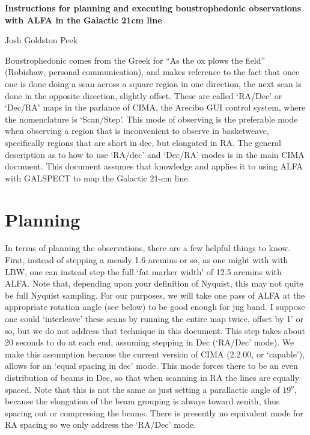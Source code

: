 \setlength{\textheight}{21.5cm}
\setlength{\textwidth}{7in}
\setlength{\topmargin}{-0.25in}
\setlength{\oddsidemargin}{-0.25in}
\setlength{\evensidemargin}{0mm}
\setlength{\parindent}{0em}
\setlength{\headsep}{10.0mm}

\def\baselinestretch{1.0}
\pagestyle{myheadings}
\def\kms{km~s$^{-1}$}


\parskip 5pt
\begin{center}
  {\Large \bf Instructions for planning and executing boustrophedonic observations with ALFA in the Galactic 21cm line}

\vspace{0.5cm} {\large Josh Goldston Peek}
\end{center}

Boustrophedonic comes from the Greek for ``As the ox plows the field'' (Robishaw, personal communication), and makes reference to the fact that once one is done doing a scan across a square region in one direction, the next scan is done in the opposite direction, slightly offset. These are called `RA/Dec' or `Dec/RA' maps in the parlance of CIMA, the Arecibo GUI control system, where the nomenclature is `Scan/Step'. This mode of observing is the preferable mode when observing a region that is inconvenient to observe in basketweave, specifically regions that are short in dec, but elongated in RA. The general description as to how to use `RA/dec' and `Dec/RA' modes is in the main CIMA document. This document assumes that knowledge and applies it to using ALFA with GALSPECT to map the Galactic 21-cm line.

\section{Planning}

In terms of planning the observations, there are a few helpful things to know. First, instead of stepping a measly 1.6 arcmins or so, as one might with with LBW, one can instead step the full `fat marker width' of 12.5 arcmins with ALFA. Note that, depending upon your definition of Nyquist, this may not quite be full Nyquist sampling. For our purposes, we will take one pass of ALFA at the appropriate rotation angle (see below) to be good enough for jug band. I suppose one could `interleave' these scans by running the entire map twice, offset by 1' or so, but we do not address that technique in this document. This step takes about 20 seconds to do at each end, assuming stepping in Dec (`RA/Dec' mode). We make this assumption because the current version of CIMA (2.2.00, or `capable'), allows for an `equal spacing in dec' mode. This mode forces there to be an even distribution of beams in Dec, so that when scanning in RA the lines are equally spaced. Note that this is not the same as just setting a parallactic angle of $19^{o}$, because the elongation of the beam grouping is always toward zenith, thus spacing out or compressing the beams. There is presently no equivalent mode for RA spacing so we only address the `RA/Dec' mode. 

